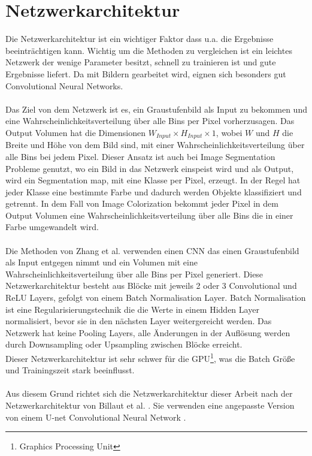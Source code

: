 \section{Netzwerkarchitektur}
Die Netzwerkarchitektur ist ein wichtiger Faktor dass u.a. die Ergebnisse beeinträchtigen kann. Wichtig um die Methoden zu vergleichen ist ein
leichtes Netzwerk der wenige Parameter besitzt, schnell zu trainieren ist und gute Ergebnisse liefert. Da mit Bildern gearbeitet wird, eignen sich
besonders gut Convolutional Neural Networks.
\\
\\
Das Ziel von dem Netzwerk ist es, ein Graustufenbild als Input zu bekommen und eine Wahrscheinlichkeitsverteilung über alle Bins per Pixel vorherzusagen.
Das Output Volumen hat die Dimensionen $ W_{Input} \times H_{Input} \times 1 $, wobei $W$ und $H$ die Breite und Höhe von dem Bild sind,
mit einer Wahrscheinlichkeitsverteilung über alle Bins bei jedem Pixel. Dieser Ansatz ist auch bei Image Segmentation Probleme genutzt, wo ein Bild
in das Netzwerk einspeist wird und als Output, wird ein Segmentation map, mit eine Klasse per Pixel, erzeugt. In der Regel hat jeder Klasse eine
bestimmte Farbe und dadurch werden Objekte klassifiziert und getrennt. In dem Fall von Image Colorization bekommt jeder Pixel in dem Output Volumen
eine Wahrscheinlichkeitsverteilung über alle Bins die in einer Farbe umgewandelt wird.
\\
\\
Die Methoden von Zhang et al. \cite{zhang2016colorful} verwenden einen \gls{CNN} das einen Graustufenbild als Input entgegen nimmt und ein Volumen mit
eine Wahrscheinlichkeitsverteilung über alle Bins per Pixel generiert. Diese Netzwerkarchitektur besteht aus Blöcke mit jeweils 2 oder 3 Convolutional
und ReLU Layers, gefolgt von einem Batch Normalisation Layer. Batch Normalisation ist eine Regularisierungstechnik die die Werte in einem Hidden Layer
normalisiert, bevor sie in den nächsten Layer weitergereicht werden. Das Netzwerk hat keine Pooling Layers, alle Änderungen in der Auflösung werden durch
Downsampling oder Upsampling zwischen Blöcke erreicht.
\\
Dieser Netzwerkarchitektur ist sehr schwer für die GPU\footnote{Graphics Processing Unit}, was die Batch Größe und Trainingszeit stark beeinflusst.
\\
\\
Aus diesem Grund richtet sich die Netzwerkarchitektur dieser Arbeit nach der Netzwerkarchitektur von Billaut et al. \cite{billaut2018colorunet}. 
Sie verwenden eine angepasste Version von einem U-net Convolutional Neural Network \cite{ronneberger2015unet}. 

